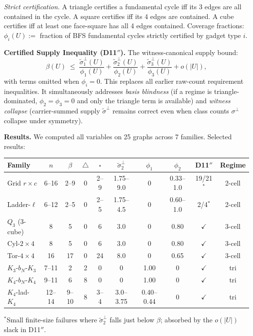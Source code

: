 \documentclass[11pt,a4paper]{article}
\theoremstyle{definition}
\theoremstyle{remark}
\begin{document}
\emph{Strict certification.} A triangle certifies a fundamental cycle iff its 3 edges are all contained in the cycle. A square certifies iff its 4 edges are contained. A cube certifies iff at least one face-square has all 4 edges contained. Coverage fractions: $\phi_i(U) :=$ fraction of BFS fundamental cycles strictly certified by gadget type $i$.

\textbf{Certified Supply Inequality (D11$''$).} The witness-canonical supply bound:
\[
\beta(U) \;\leq\; \frac{\tilde\sigma_1^\perp(U)}{\phi_1(U)} + \frac{\tilde\sigma_2^\perp(U)}{\phi_2(U)} + \frac{\tilde\sigma_3^\perp(U)}{\phi_3(U)} + o(|U|),
\]
with terms omitted when $\phi_i = 0$. This replaces all earlier raw-count requirement inequalities. It simultaneously addresses \emph{basis blindness} (if a regime is triangle-dominated, $\phi_2 = \phi_3 = 0$ and only the triangle term is available) and \emph{witness collapse} (carrier-summed supply $\tilde\sigma^\perp$ remains correct even when class counts $\sigma^\perp$ collapse under symmetry).

\textbf{Results.} We computed all variables on 25 graphs across 7 families. Selected results:

\begin{center}
\begin{tabular}{lccccccccc}
\toprule
\textbf{Family} & $n$ & $\beta$ & $\triangle$ & $\square$ & $\tilde\sigma_2^\perp$ & $\phi_1$ & $\phi_2$ & \textbf{D11$''$} & \textbf{Regime} \\
\midrule
Grid $r{\times}c$ & 6--16 & 2--9 & 0 & 2--9 & 1.75--9.0 & 0 & 0.33--1.0 & 19/21$^*$ & 2-cell \\
Ladder-$\ell$ & 6--12 & 2--5 & 0 & 2--5 & 1.75--4.5 & 0 & 0.60--1.0 & 2/4$^*$ & 2-cell \\
$Q_3$ (3-cube) & 8 & 5 & 0 & 6 & 3.0 & 0 & 0.80 & $\checkmark$ & 3-cell \\
Cyl-$2{\times}4$ & 8 & 5 & 0 & 6 & 3.0 & 0 & 0.80 & $\checkmark$ & 3-cell \\
Tor-$4{\times}4$ & 16 & 17 & 0 & 24 & 8.0 & 0 & 0.65 & $\checkmark$ & 3-cell \\
\midrule
$K_3$-$b_N$-$K_3$ & 7--11 & 2 & 2 & 0 & 0 & 1.00 & 0 & $\checkmark$ & tri \\
$K_4$-$b_N$-$K_4$ & 9--11 & 6 & 8 & 0 & 0 & 1.00 & 0 & $\checkmark$ & tri \\
$K_4$-lad-$K_4$ & 12--14 & 9--10 & 8 & 3--4 & 3.0--3.75 & 0.40--0.44 & 0 & $\checkmark$ & tri \\
\bottomrule
\end{tabular}
\end{center}
{\footnotesize $^*$Small finite-size failures where $\tilde\sigma_2^\perp$ falls just below $\beta$; absorbed by the $o(|U|)$ slack in D11$''$.}
\end{document}
